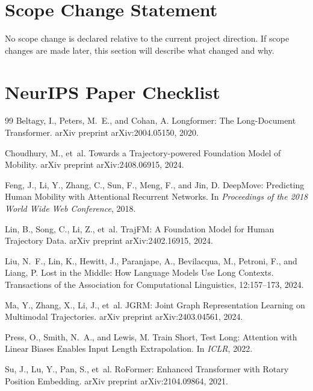 \documentclass{article}
\begin{document}
\section{Scope Change Statement}
No scope change is declared relative to the current project direction. If scope changes are made later, this section will describe what changed and why.

\newpage
\section*{NeurIPS Paper Checklist}


\begin{thebibliography}{99}
Beltagy, I., Peters, M.~E., and Cohan, A.
\newblock Longformer: The Long-Document Transformer.
\newblock arXiv preprint arXiv:2004.05150, 2020.

Choudhury, M., et~al.
\newblock Towards a Trajectory-powered Foundation Model of Mobility.
\newblock arXiv preprint arXiv:2408.06915, 2024.

Feng, J., Li, Y., Zhang, C., Sun, F., Meng, F., and Jin, D.
\newblock DeepMove: Predicting Human Mobility with Attentional Recurrent Networks.
\newblock In \emph{Proceedings of the 2018 World Wide Web Conference}, 2018.

Lin, B., Song, C., Li, Z., et~al.
\newblock TrajFM: A Foundation Model for Human Trajectory Data.
\newblock arXiv preprint arXiv:2402.16915, 2024.

Liu, N.~F., Lin, K., Hewitt, J., Paranjape, A., Bevilacqua, M., Petroni, F., and Liang, P.
\newblock Lost in the Middle: How Language Models Use Long Contexts.
\newblock Transactions of the Association for Computational Linguistics, 12:157--173, 2024.

Ma, Y., Zhang, X., Li, J., et~al.
\newblock JGRM: Joint Graph Representation Learning on Multimodal Trajectories.
\newblock arXiv preprint arXiv:2403.04561, 2024.

Press, O., Smith, N.~A., and Lewis, M.
\newblock Train Short, Test Long: Attention with Linear Biases Enables Input Length Extrapolation.
\newblock In \emph{ICLR}, 2022.

Su, J., Lu, Y., Pan, S., et~al.
\newblock RoFormer: Enhanced Transformer with Rotary Position Embedding.
\newblock arXiv preprint arXiv:2104.09864, 2021.


\end{thebibliography}
\end{document}
